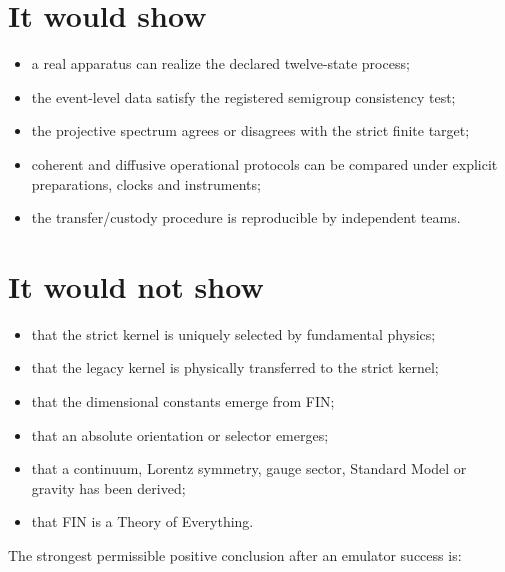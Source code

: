 \documentclass[11pt,a4paper,openany]{report}
\begin{document}
\section{It would show}

\begin{itemize}
\item 
a real apparatus can realize the declared twelve-state process;

\item 
the event-level data satisfy the registered semigroup consistency test;

\item 
the projective spectrum agrees or disagrees with the strict finite target;

\item 
coherent and diffusive operational protocols can be compared under explicit preparations, clocks and instruments;

\item 
the transfer/\allowbreak{}custody procedure is reproducible by independent teams.

\end{itemize}

\section{It would not show}

\begin{itemize}
\item 
that the strict kernel is uniquely selected by fundamental physics;

\item 
that the legacy kernel is physically transferred to the strict kernel;

\item 
that the dimensional constants emerge from FIN;

\item 
that an absolute orientation or selector emerges;

\item 
that a continuum, Lorentz symmetry, gauge sector, Standard Model or gravity has been derived;

\item 
that FIN is a Theory of Everything.

\end{itemize}

The strongest permissible positive conclusion after an emulator success is:
\end{document}
